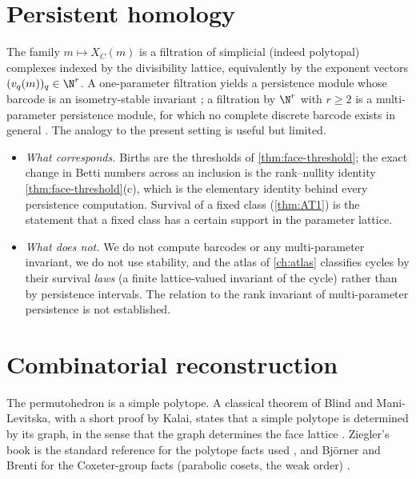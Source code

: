\section{Persistent homology}\label{sec:persistence}
The family $m\mapsto X_C(m)$ is a filtration of simplicial (indeed polytopal) complexes indexed by the divisibility lattice, equivalently by the exponent vectors $(v_q(m))_q\in\N^r$. A one-parameter filtration yields a persistence module whose barcode is an isometry-stable invariant \cite{ELZ02,Carlsson09}; a filtration by $\N^r$ with $r\ge 2$ is a multi-parameter persistence module, for which no complete discrete barcode exists in general \cite{CarlssonZomorodian}. The analogy to the present setting is useful but limited.
\begin{itemize}
\item \emph{What corresponds.} Births are the thresholds of \cref{thm:face-threshold}; the exact change in Betti numbers across an inclusion is the rank--nullity identity \cref{thm:face-threshold}(c), which is the elementary identity behind every persistence computation. Survival of a fixed class (\cref{thm:AT1}) is the statement that a fixed class has a certain support in the parameter lattice.
\item \emph{What does not.} We do not compute barcodes or any multi-parameter invariant, we do not use stability, and the atlas of \cref{ch:atlas} classifies cycles by their survival \emph{laws} (a finite lattice-valued invariant of the cycle) rather than by persistence intervals. The relation to the rank invariant of multi-parameter persistence is not established.
\end{itemize}

\section{Combinatorial reconstruction}\label{sec:reconstruction}
The permutohedron is a simple polytope. A classical theorem of Blind and Mani-Levitska, with a short proof by Kalai, states that a simple polytope is determined by its graph, in the sense that the graph determines the face lattice \cite{BlindManiLevitska,Kalai88}. Ziegler's book is the standard reference for the polytope facts used \cite{Ziegler}, and Bj\"orner and Brenti for the Coxeter-group facts (parabolic cosets, the weak order) \cite{BjornerBrenti}.

